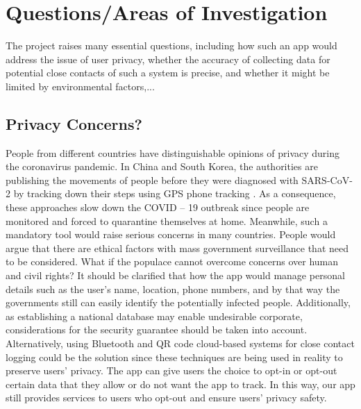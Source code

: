 \section{Questions/Areas of Investigation}
  \par The project raises many essential questions, including how such an app would address the issue of user privacy, whether the accuracy of collecting data for potential close contacts of such a system is precise, and whether it might be limited by environmental factors,...
  \subsection{Privacy Concerns?}
    \par People from different countries have distinguishable opinions of privacy during the coronavirus pandemic. In China and South Korea, the authorities are publishing the movements of people before they were diagnosed with SARS-CoV-2 by tracking down their steps using GPS phone tracking \parencite{SingTraceTogether}. As a consequence, these approaches slow down the COVID – 19 outbreak since people are monitored and forced to quarantine themselves at home. Meanwhile, such a mandatory tool would raise serious concerns in many countries. People would argue that there are ethical factors with mass government surveillance that need to be considered. What if the populace cannot overcome concerns over human and civil rights? It should be clarified that how the app would manage personal details such as the user’s name, location, phone numbers, and by that way the governments still can easily identify the potentially infected people. Additionally, as establishing a national database may enable undesirable corporate, considerations for the security guarantee should be taken into account. Alternatively, using Bluetooth and QR code cloud-based systems for close contact logging could be the solution since these techniques are being used in reality to preserve users’ privacy. The app can give users the choice to opt-in or opt-out certain data that they allow or do not want the app to track. In this way, our app still provides services to users who opt-out and ensure users’ privacy safety.
